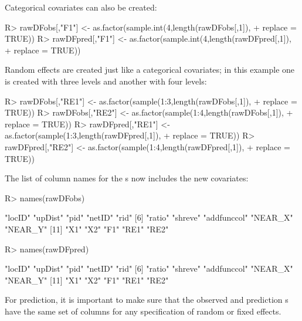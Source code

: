 \documentclass[nojss]{jss}
\renewenvironment{Schunk}{\vspace{\topsep}}{\vspace{\topsep}}
\begin{document}
Categorical covariates can also be created:

\begin{Schunk}
\begin{Sinput}
R> rawDFobs[,"F1"] <- as.factor(sample.int(4,length(rawDFobs[,1]),
+     replace = TRUE))
R> rawDFpred[,"F1"] <- as.factor(sample.int(4,length(rawDFpred[,1]),
+     replace = TRUE))
\end{Sinput}
\end{Schunk}

Random effects are created just like a categorical covariates; in this
example one is created with three levels and another with four levels:

\begin{Schunk}
\begin{Sinput}
R> rawDFobs[,"RE1"] <- as.factor(sample(1:3,length(rawDFobs[,1]),
+     replace = TRUE))
R> rawDFobs[,"RE2"] <- as.factor(sample(1:4,length(rawDFobs[,1]),
+     replace = TRUE))
R> rawDFpred[,"RE1"] <- as.factor(sample(1:3,length(rawDFpred[,1]),
+     replace = TRUE))
R> rawDFpred[,"RE2"] <- as.factor(sample(1:4,length(rawDFpred[,1]),
+     replace = TRUE))
\end{Sinput}
\end{Schunk}

The list of column names for the s now includes the
new covariates:
\begin{Schunk}
\begin{Sinput}
R> names(rawDFobs)
\end{Sinput}
\begin{Soutput}
 [1] "locID"      "upDist"     "pid"        "netID"      "rid"       
 [6] "ratio"      "shreve"     "addfunccol" "NEAR_X"     "NEAR_Y"    
[11] "X1"         "X2"         "F1"         "RE1"        "RE2"       
\end{Soutput}
\begin{Sinput}
R> names(rawDFpred)
\end{Sinput}
\begin{Soutput}
 [1] "locID"      "upDist"     "pid"        "netID"      "rid"       
 [6] "ratio"      "shreve"     "addfunccol" "NEAR_X"     "NEAR_Y"    
[11] "X1"         "X2"         "F1"         "RE1"        "RE2"       
\end{Soutput}
\end{Schunk}

For prediction, it is important to make sure that the observed and
prediction s have the same set of columns for any
specification of random or fixed effects.
\end{document}
